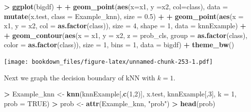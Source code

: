 \documentclass[]{krantz}
\makeatletter
\newenvironment{Shaded}{\begin{snugshade}}{\end{snugshade}}
\newcommand{\KeywordTok}[1]{\textcolor[rgb]{0.27,0.27,0.27}{\textbf{#1}}}
\newcommand{\DataTypeTok}[1]{\textcolor[rgb]{0.27,0.27,0.27}{#1}}
\newcommand{\DecValTok}[1]{\textcolor[rgb]{0.06,0.06,0.06}{#1}}
\newcommand{\FloatTok}[1]{\textcolor[rgb]{0.06,0.06,0.06}{#1}}
\newcommand{\StringTok}[1]{\textcolor[rgb]{0.5,0.5,0.5}{#1}}
\newcommand{\OtherTok}[1]{\textcolor[rgb]{0.37,0.37,0.37}{#1}}
\newcommand{\OperatorTok}[1]{\textcolor[rgb]{0.43,0.43,0.43}{\textbf{#1}}}
\newcommand{\NormalTok}[1]{#1}
\newenvironment{kframe}{%
\medskip{}
\setlength{\fboxsep}{.8em}
 \def\at@end@of@kframe{}%
 \ifinner\ifhmode%
  \def\at@end@of@kframe{\end{minipage}}%
  \begin{minipage}{\columnwidth}%
 \fi\fi%
 \def\FrameCommand##1{\hskip\@totalleftmargin \hskip-\fboxsep
 \colorbox{shadecolor}{##1}\hskip-\fboxsep
     \hskip-\linewidth \hskip-\@totalleftmargin \hskip\columnwidth}%
 \MakeFramed {\advance\hsize-\width
   \@totalleftmargin\z@ \linewidth\hsize
   \@setminipage}}%
 {\par\unskip\endMakeFramed%
 \at@end@of@kframe}
\renewenvironment{Shaded}{\begin{kframe}}{\end{kframe}}
\makeatother
\begin{document}
\begin{Shaded}
\begin{Highlighting}[]
\OperatorTok{>}\StringTok{ }\KeywordTok{ggplot}\NormalTok{(bigdf) }\OperatorTok{+}\StringTok{ }
\OperatorTok{+}\StringTok{    }\KeywordTok{geom_point}\NormalTok{(}\KeywordTok{aes}\NormalTok{(}\DataTypeTok{x=}\NormalTok{x1, }\DataTypeTok{y =}\NormalTok{x2, }\DataTypeTok{col=}\NormalTok{class), }\DataTypeTok{data =} \KeywordTok{mutate}\NormalTok{(x.test, }\DataTypeTok{class =}\NormalTok{ Example_knn), }\DataTypeTok{size =} \FloatTok{0.5}\NormalTok{) }\OperatorTok{+}\StringTok{ }
\OperatorTok{+}\StringTok{    }\KeywordTok{geom_point}\NormalTok{(}\KeywordTok{aes}\NormalTok{(}\DataTypeTok{x =}\NormalTok{ x1, }\DataTypeTok{y =}\NormalTok{ x2, }\DataTypeTok{col =} \KeywordTok{as.factor}\NormalTok{(class)), }\DataTypeTok{size =} \DecValTok{4}\NormalTok{, }\DataTypeTok{shape =} \DecValTok{1}\NormalTok{, }\DataTypeTok{data =}\NormalTok{ knnExample) }\OperatorTok{+}\StringTok{ }
\OperatorTok{+}\StringTok{    }\KeywordTok{geom_contour}\NormalTok{(}\KeywordTok{aes}\NormalTok{(}\DataTypeTok{x =}\NormalTok{ x1, }\DataTypeTok{y =}\NormalTok{ x2, }\DataTypeTok{z =}\NormalTok{ prob_cls, }\DataTypeTok{group =} \KeywordTok{as.factor}\NormalTok{(class), }\DataTypeTok{color =} \KeywordTok{as.factor}\NormalTok{(class)), }\DataTypeTok{size =} \DecValTok{1}\NormalTok{, }\DataTypeTok{bins =} \DecValTok{1}\NormalTok{, }\DataTypeTok{data =}\NormalTok{ bigdf) }\OperatorTok{+}\StringTok{ }\KeywordTok{theme_bw}\NormalTok{()}
\end{Highlighting}
\end{Shaded}

\texttt{[image: bookdown\_files/figure-latex/unnamed-chunk-253-1.pdf]}

Next we graph the decision boundary of kNN with \(k=1\).

\begin{Shaded}
\begin{Highlighting}[]
\OperatorTok{>}\StringTok{ }\NormalTok{Example_knn <-}\StringTok{ }\KeywordTok{knn}\NormalTok{(knnExample[,}\KeywordTok{c}\NormalTok{(}\DecValTok{1}\NormalTok{,}\DecValTok{2}\NormalTok{)], x.test, knnExample[,}\DecValTok{3}\NormalTok{], }\DataTypeTok{k =} \DecValTok{1}\NormalTok{, }\DataTypeTok{prob =} \OtherTok{TRUE}\NormalTok{)}
\OperatorTok{>}\StringTok{ }\NormalTok{prob <-}\StringTok{ }\KeywordTok{attr}\NormalTok{(Example_knn, }\StringTok{"prob"}\NormalTok{)}
\OperatorTok{>}\StringTok{ }\KeywordTok{head}\NormalTok{(prob)}
\end{Highlighting}
\end{Shaded}
\end{document}
